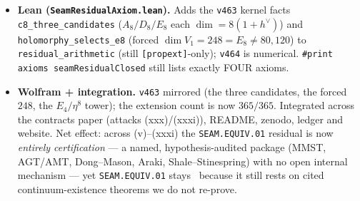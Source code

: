 \begin{itemize}
($\max|P_{2N}{-}P_N|{\sim}1/N{\to}0$). \mE\ the limit is $c{=}1$ Dirac: entanglement $S(L){=}(c/3)\ln L$ gives
$c{\to}1$, $16$ copies $\Rightarrow c_-{=}8$ (ties \texttt{v450}). \mC\ Shale--Stinespring makes the Bogoliubov map
implementable, so $R_1$ is upgraded from a bald axiom to ``the unique quasi-free realisation, modulo the named CAR
functor''. Python-only (numpy).
\item \textbf{Lean (\texttt{SeamResidualAxiom.lean}).} Adds the \texttt{v463} kernel facts
\texttt{c8\_three\_candidates} ($A_8/D_8/E_8$ each $\dim{=}8(1{+}h^\vee)$) and \texttt{holomorphy\_selects\_e8}
(forced $\dim V_1{=}248{=}E_8 \neq 80,120$) to \texttt{residual\_arithmetic} (still \texttt{[propext]}-only); \texttt{v464}
is numerical. \texttt{\#print axioms seamResidualClosed} still lists exactly FOUR axioms.
\item \textbf{Wolfram + integration.} \texttt{v463} mirrored (the three candidates, the forced $248$, the $E_4/\eta^8$
tower); the extension count is now $365/365$. Integrated across the contracts paper (attacks (xxx)/(xxxi)), README,
zenodo, ledger and website. Net effect: across (v)--(xxxi) the \texttt{SEAM.EQUIV.01} residual is now \emph{entirely
certification} --- a named, hypothesis-audited package (MMST, AGT/AMT, Dong--Mason, Araki, Shale--Stinespring) with no
open internal mechanism --- yet \texttt{SEAM.EQUIV.01} stays \mO\ because it still rests on cited continuum-existence
theorems we do not re-prove.
\end{itemize}

